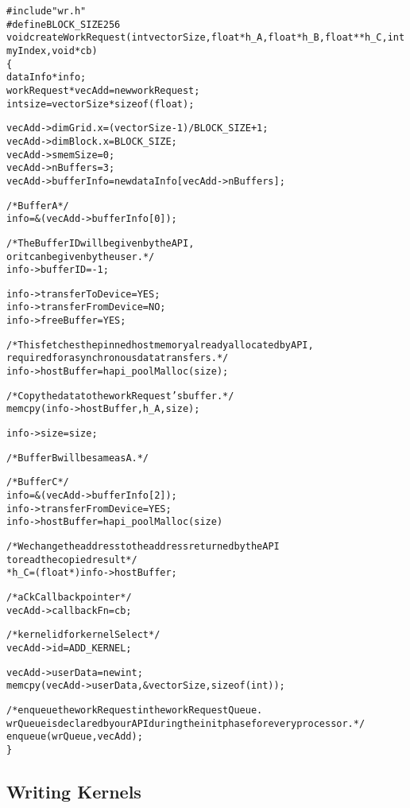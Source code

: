\documentclass[10pt]{report}
\begin{document}
\begin{alltt}
#include "wr.h"
#define BLOCK_SIZE 256
void createWorkRequest(int vectorSize, float *h_A, float *h_B, float **h_C, int myIndex, void *cb)
\{
    dataInfo *info;
    workRequest *vecAdd = new workRequest;
    int size = vectorSize * sizeof(float);

    vecAdd->dimGrid.x = (vectorSize - 1) / BLOCK_SIZE + 1;
    vecAdd->dimBlock.x = BLOCK_SIZE;
    vecAdd->smemSize = 0;
    vecAdd->nBuffers = 3;
    vecAdd->bufferInfo = new dataInfo[vecAdd->nBuffers];

    /* Buffer A */
    info = &(vecAdd->bufferInfo[0]);

    /* The Buffer ID will be given by the API,
       or it can be given by the user. */
    info->bufferID = -1;

    info->transferToDevice = YES;
    info->transferFromDevice = NO;
    info->freeBuffer = YES;

    /* This fetches the pinned host memory already allocated by API,
       required for asynchronous data transfers. */
    info->hostBuffer = hapi_poolMalloc(size);

    /* Copy the data to the workRequest's buffer. */
    memcpy(info->hostBuffer, h_A, size);

    info->size = size;

    /* Buffer B will be same as A.*/

    /* Buffer C */
    info = &(vecAdd->bufferInfo[2]);
    info->transferFromDevice = YES;
    info->hostBuffer = hapi_poolMalloc(size)

    / * We change the address to the address returned by the API
        to read the copied result */
    *h_C = (float *)info->hostBuffer;

    /* a CkCallback pointer */
    vecAdd->callbackFn = cb;

    /* kernel id for kernelSelect */
    vecAdd->id = ADD_KERNEL;

    vecAdd->userData = new int;
    memcpy(vecAdd->userData, &vectorSize, sizeof(int));

    /* enqueue the workRequest in the workRequestQueue.
    wrQueue is declared by our API during the init phase for every processor. */
    enqueue(wrQueue, vecAdd);
\}
\end{alltt}

\subsection{Writing Kernels}
\end{document}
